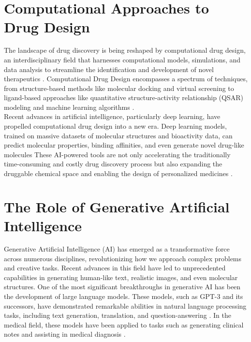 \section{Computational Approaches to Drug Design} 
The landscape of drug discovery is being reshaped by computational drug design, an interdisciplinary
field that harnesses computational models, simulations, and data analysis to streamline the
identification and development of novel therapeutics \cite{schneider2020rethinking}. Computational
Drug Design encompasses a spectrum of techniques, from structure-based methods like molecular
docking \cite{kitchen2004docking} and virtual screening \cite{shoichet2004virtual} to ligand-based
approaches like quantitative structure-activity relationship (QSAR) modeling
\cite{cherkasov2014qsar} and machine learning algorithms \cite{gawehn2016dl}. \\

Recent advances in artificial intelligence, particularly deep learning, have propelled computational
drug design into a new era. Deep learning models, trained on massive datasets of molecular
structures and bioactivity data, can predict molecular properties, binding affinities, and even
generate novel drug-like molecules \cite{zeng2022deep} These AI-powered tools are not only
accelerating the traditionally time-consuming and costly drug discovery process but also expanding
the druggable chemical space and enabling the design of personalized medicines \cite{gawehn2016dl}.


\section{The Role of Generative Artificial Intelligence} 
Generative Artificial Intelligence (AI) has emerged as a transformative force across numerous disciplines, revolutionizing how we approach complex problems and creative tasks. Recent advances in this field have led to unprecedented capabilities in generating human-like text, realistic images, and even molecular structures. One of the most significant breakthroughs in generative AI has been the development of large language models. These models, such as GPT-3 and its successors, have demonstrated remarkable abilities in natural language processing tasks, including text generation, translation, and question-answering \cite{lewis2021rag}. In the medical field, these models have been applied to tasks such as generating clinical notes and assisting in medical diagnosis \cite{krishna2021soap}. \\

